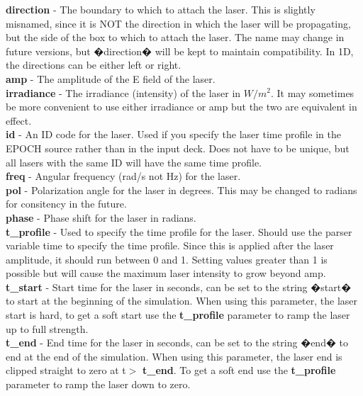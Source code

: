 \documentclass[12pt]{article}
\newcommand{\emphtext}{\color{warwickdark} \fontfamily{phv}\selectfont\Large\bf}
\newcommand{\inlineemph}{\color{warwicklight} \bf}
\newcommand{\EPOCH}{{\color{warwickdark}\fontfamily{phv}\selectfont EPOCH} }
\begin{document}
{\emphtext direction} - The boundary to which to attach the laser. This is
slightly misnamed, since it is NOT the direction in which the laser will be
propagating, but the side of the box to which to attach the laser. The name may
change in future versions, but �direction� will be kept to maintain
compatibility. In 1D, the directions can be either left or right.\\

{\emphtext amp} - The amplitude of the E field of the laser.\\

{\emphtext irradiance} - The irradiance (intensity) of the laser in $W/m^2$. It
may sometimes be more convenient to use either irradiance or amp but the two
are equivalent in effect.\\

{\emphtext id} - An ID code for the laser. Used if you specify the laser time
profile in the \EPOCH source rather than in the input deck. Does not have to be
unique, but all lasers with the same ID will have the same time profile.\\

{\emphtext freq} - Angular frequency (rad/s not Hz) for the laser.\\

{\emphtext pol} - Polarization angle for the laser in degrees. This may be
changed to radians for consitency in the future. \\

{\emphtext phase} - Phase shift for the laser in radians.\\

{\emphtext t\_profile} - Used to specify the time profile for the laser. Should
use the parser variable time to specify the time profile. Since this is applied
after the laser amplitude, it should run between 0 and 1. Setting values
greater than 1 is possible but will cause the maximum laser intensity to grow
beyond amp.\\

{\emphtext t\_start} - Start time for the laser in seconds, can be set to the
string �start� to start at the beginning of the simulation. When using this
parameter, the laser start is hard, to get a soft start use the {\inlineemph
t\_profile} parameter to ramp the laser up to full strength.\\

{\emphtext t\_end} - End time for the laser in seconds, can be set to the
string �end� to end at the end of the simulation. When using this parameter,
the laser end is clipped straight to zero at t$>${\inlineemph t\_end}. To get a
soft end use the {\inlineemph t\_profile} parameter to ramp the laser down to
zero.\\
\end{document}
